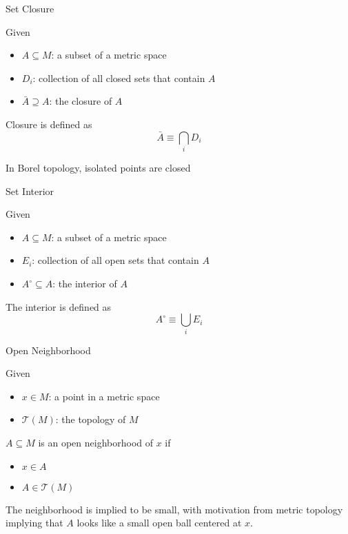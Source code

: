\begin{definition}{Set Closure}

    Given
    \begin{itemize}
        \item $A \subseteq M$: a subset of a metric space
        \item ${D_i}$: collection of all closed sets that contain $A$
        \item $\bar{A} \supseteq A$: the closure of $A$
    \end{itemize}
    Closure is defined as
    \begin{equation}
        \bar{A} \equiv \bigcap_{i} D_i
    \end{equation}

    \begin{remark}
        In Borel topology, isolated points are closed
    \end{remark}
\end{definition}

\begin{definition}{Set Interior}

    Given
    \begin{itemize}
        \item $A \subseteq M$: a subset of a metric space
        \item ${E_i}$: collection of all open sets that contain $A$
        \item $A^\circ \subseteq A$: the interior of $A$
    \end{itemize}
    The interior is defined as
    \begin{equation}
        A^\circ \equiv \bigcup_{i} E_i
    \end{equation}
    
\end{definition}

\begin{definition}{Open Neighborhood}

    Given
    \begin{itemize}
        \item $x \in M$: a point in a metric space
        \item $\mathcal{T}(M)$: the topology of $M$
    \end{itemize}
    $A \subseteq M$ is an open neighborhood of $x$ if
    \begin{itemize}
        \item $x \in A$
        \item $A \in \mathcal{T}(M)$
    \end{itemize}
    
    \begin{remark}
        The neighborhood is implied to be small, with motivation from metric topology implying that $A$ looks like a small open ball centered at $x$.
    \end{remark}
\end{definition}